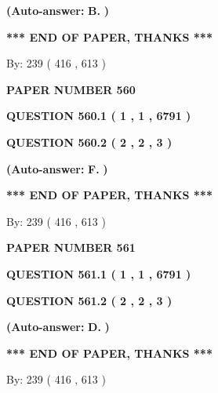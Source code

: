 \documentclass[12pt]{article}
\begin{document}
 
{\textbf{(Auto-answer:}}
{\textbf{\large{
B.}}}
{\textbf{)}}
 
 
   
   
   
   
\vspace{1.0in} 
{\textbf{\large{ *** END OF PAPER, THANKS *** }}} 
   
   
\hspace{1.0in} By: 
 239 ( 416 ,  613 )
   
   
   
   
\newpage 
\setcounter{page}{ 
   560001 } 
   
   
 {\textbf{ \Large{ PAPER NUMBER  560  }}}
   
   
   
   
  
  
{\textbf{\large{QUESTION
560.1 
 ( 1 , 1 , 6791 )
}}}
  
  
{\textbf{\large{QUESTION
560.2 
 ( 2 , 2 , 3 )
}}}
 
 
{\textbf{(Auto-answer:}}
{\textbf{\large{
F.}}}
{\textbf{)}}
 
 
   
   
   
   
\vspace{1.0in} 
{\textbf{\large{ *** END OF PAPER, THANKS *** }}} 
   
   
\hspace{1.0in} By: 
 239 ( 416 ,  613 )
   
   
   
   
\newpage 
\setcounter{page}{ 
   561001 } 
   
   
 {\textbf{ \Large{ PAPER NUMBER  561  }}}
   
   
   
   
  
  
{\textbf{\large{QUESTION
561.1 
 ( 1 , 1 , 6791 )
}}}
  
  
{\textbf{\large{QUESTION
561.2 
 ( 2 , 2 , 3 )
}}}
 
 
{\textbf{(Auto-answer:}}
{\textbf{\large{
D.}}}
{\textbf{)}}
 
 
   
   
   
   
\vspace{1.0in} 
{\textbf{\large{ *** END OF PAPER, THANKS *** }}} 
   
   
\hspace{1.0in} By: 
 239 ( 416 ,  613 )
   
   
   
   
\newpage 
\setcounter{page}{ 
   562001 } 
   
\end{document}
